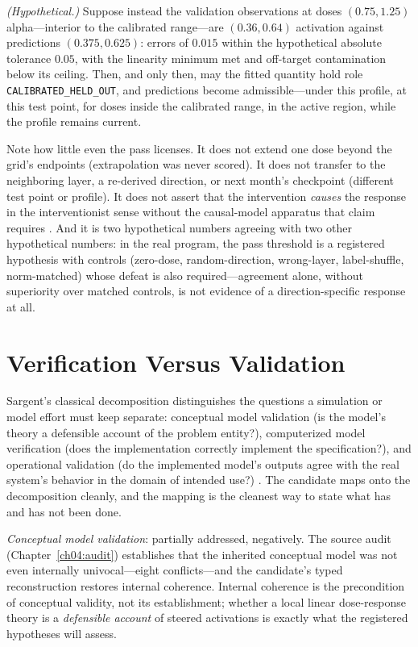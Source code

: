 \begin{example}\label{ch06:ex:pass}
\emph{(Hypothetical.)} Suppose instead the validation observations at
doses $(0.75, 1.25)$ alpha---interior to the calibrated range---are
$(0.36, 0.64)$ activation against predictions $(0.375, 0.625)$: errors of
$0.015$ within the hypothetical absolute tolerance $0.05$, with the
linearity minimum met and off-target contamination below its ceiling.
Then, and only then, may the fitted quantity hold role
\texttt{CALIBRATED\_HELD\_OUT}, and predictions become admissible---under
this profile, at this test point, for doses inside the calibrated range,
in the active region, while the profile remains current.

Note how little even the pass licenses. It does not extend one dose beyond
the grid's endpoints (extrapolation was never scored). It does not
transfer to the neighboring layer, a re-derived direction, or next month's
checkpoint (different test point or profile). It does not assert that the
intervention \emph{causes} the response in the interventionist sense
without the causal-model apparatus that claim requires \cite{pearl}. And
it is two hypothetical numbers agreeing with two other hypothetical
numbers: in the real program, the pass threshold is a registered
hypothesis with controls (zero-dose, random-direction, wrong-layer,
label-shuffle, norm-matched) whose defeat is also required---agreement
alone, without superiority over matched controls, is not evidence of a
direction-specific response at all.
\end{example}

\section{Verification Versus Validation}\label{ch06:vandv}

Sargent's classical decomposition distinguishes the questions a simulation
or model effort must keep separate: conceptual model validation (is the
model's theory a defensible account of the problem entity?), computerized
model verification (does the implementation correctly implement the
specification?), and operational validation (do the implemented model's
outputs agree with the real system's behavior in the domain of intended
use?) \cite{sargent}. The candidate maps onto the decomposition cleanly,
and the mapping is the cleanest way to state what has and has not been
done.

\emph{Conceptual model validation}: partially addressed, negatively. The
source audit (Chapter~\ref{ch04:audit}) establishes that the inherited
conceptual model was not even internally univocal---eight conflicts---and
the candidate's typed reconstruction restores internal coherence. Internal
coherence is the precondition of conceptual validity, not its
establishment; whether a local linear dose-response theory is a
\emph{defensible account} of steered activations is exactly what the
registered hypotheses will assess.

